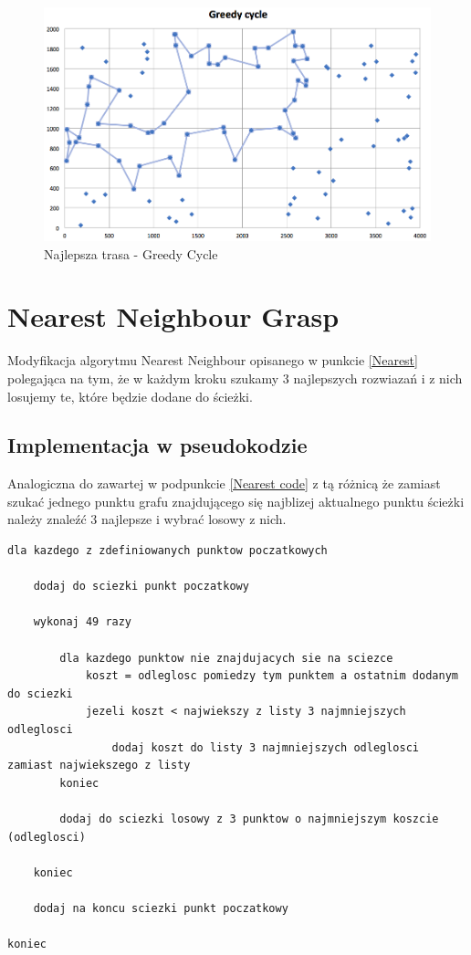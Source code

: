 \documentclass[a4paper 10pt]{article}
\begin{document}
\begin{figure} [H]
\centering
\includegraphics[angle=0,width = 1\textwidth, height=!]{images/GC.png}
\caption{Najlepsza trasa - Greedy Cycle}
\label{Rys. NN}
\end{figure}

\section{Nearest Neighbour Grasp}
Modyfikacja algorytmu Nearest Neighbour opisanego w punkcie \ref{Nearest} polegająca na tym, że w każdym kroku szukamy 3 najlepszych rozwiazań i z nich losujemy te, które będzie dodane do ścieżki.
\subsection{Implementacja w pseudokodzie}
Analogiczna do zawartej w podpunkcie \ref{Nearest code} z tą różnicą że zamiast szukać jednego punktu grafu znajdującego się najblizej aktualnego punktu ścieżki należy znaleźć 3 najlepsze i wybrać losowy z nich.

\begin{lstlisting}[frame=single]
dla kazdego z zdefiniowanych punktow poczatkowych
	
	dodaj do sciezki punkt poczatkowy
			
	wykonaj 49 razy 
	
		dla kazdego punktow nie znajdujacych sie na sciezce
			koszt = odleglosc pomiedzy tym punktem a ostatnim dodanym do sciezki
			jezeli koszt < najwiekszy z listy 3 najmniejszych odleglosci
				dodaj koszt do listy 3 najmniejszych odleglosci zamiast najwiekszego z listy
		koniec
	
		dodaj do sciezki losowy z 3 punktow o najmniejszym koszcie (odleglosci)
		
	koniec	
	
	dodaj na koncu sciezki punkt poczatkowy
	
koniec

\end{lstlisting}
\end{document}
